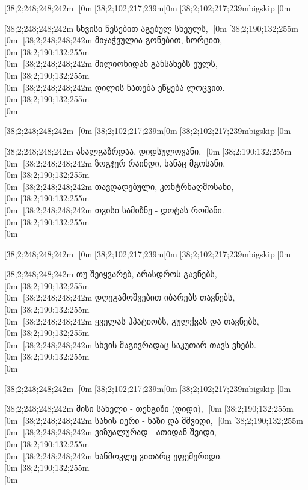 [38;2;248;248;242m    [0m[38;2;102;217;239m\[0m[38;2;102;217;239mbigskip[0m

[38;2;248;248;242m    სხვისი წესებით აგებულ სხეულს, [0m[38;2;190;132;255m\\[0m
[38;2;248;248;242m    მიჯაჭვულია გონებით, ხორცით, [0m[38;2;190;132;255m\\[0m
[38;2;248;248;242m    მილიონიდან განსახებს ეულს, [0m[38;2;190;132;255m\\[0m
[38;2;248;248;242m    დილის ნათება ეწყება ლოცვით. [0m[38;2;190;132;255m\\[0m

[38;2;248;248;242m    [0m[38;2;102;217;239m\[0m[38;2;102;217;239mbigskip[0m

[38;2;248;248;242m    ახალგაზრდაა, დიდსულოვანი, [0m[38;2;190;132;255m\\[0m
[38;2;248;248;242m    ზოგჯერ რაინდი, ხანაც მგოსანი, [0m[38;2;190;132;255m\\[0m
[38;2;248;248;242m    თავდადებული, კონტრნაღმოსანი, [0m[38;2;190;132;255m\\[0m
[38;2;248;248;242m    თვისი სამიზნე - დოტას როშანი. [0m[38;2;190;132;255m\\[0m

[38;2;248;248;242m    [0m[38;2;102;217;239m\[0m[38;2;102;217;239mbigskip[0m

[38;2;248;248;242m    თუ შეიყვარებ, არასდროს გავნებს, [0m[38;2;190;132;255m\\[0m
[38;2;248;248;242m    დღეგამოშვებით იბარებს თავნებს, [0m[38;2;190;132;255m\\[0m
[38;2;248;248;242m    ყველას ჰპატიობს, გულქვას და თავნებს, [0m[38;2;190;132;255m\\[0m
[38;2;248;248;242m    სხვის მაგივრადაც საკუთარ თავს ვნებს. [0m[38;2;190;132;255m\\[0m

[38;2;248;248;242m    [0m[38;2;102;217;239m\[0m[38;2;102;217;239mbigskip[0m

[38;2;248;248;242m    მისი სახელი - თენგიზი (დიდი), [0m[38;2;190;132;255m\\[0m
[38;2;248;248;242m    სახის იერი - ნაზი და მშვიდი, [0m[38;2;190;132;255m\\[0m
[38;2;248;248;242m    ვიზუალურად - ათიდან შვიდი, [0m[38;2;190;132;255m\\[0m
[38;2;248;248;242m    ხანმოკლე ვითარც ეფემერიდი. [0m[38;2;190;132;255m\\[0m

